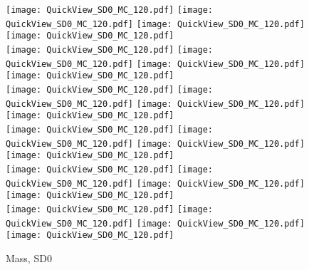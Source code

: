 \documentclass[amsmath,amssymb,aps,floatfix]{revtex4-1}
\begin{document}
\begin{figure}
   \centering
   \texttt{[image: QuickView\_SD0\_MC\_120.pdf]}
   \texttt{[image: QuickView\_SD0\_MC\_120.pdf]}
   \texttt{[image: QuickView\_SD0\_MC\_120.pdf]}
   \texttt{[image: QuickView\_SD0\_MC\_120.pdf]}\\
   \texttt{[image: QuickView\_SD0\_MC\_120.pdf]}
   \texttt{[image: QuickView\_SD0\_MC\_120.pdf]}
   \texttt{[image: QuickView\_SD0\_MC\_120.pdf]}
   \texttt{[image: QuickView\_SD0\_MC\_120.pdf]}\\
   \texttt{[image: QuickView\_SD0\_MC\_120.pdf]}
   \texttt{[image: QuickView\_SD0\_MC\_120.pdf]}
   \texttt{[image: QuickView\_SD0\_MC\_120.pdf]}
   \texttt{[image: QuickView\_SD0\_MC\_120.pdf]}\\
   \texttt{[image: QuickView\_SD0\_MC\_120.pdf]}
   \texttt{[image: QuickView\_SD0\_MC\_120.pdf]}
   \texttt{[image: QuickView\_SD0\_MC\_120.pdf]}
   \texttt{[image: QuickView\_SD0\_MC\_120.pdf]}\\
   \texttt{[image: QuickView\_SD0\_MC\_120.pdf]}
   \texttt{[image: QuickView\_SD0\_MC\_120.pdf]}
   \texttt{[image: QuickView\_SD0\_MC\_120.pdf]}
   \texttt{[image: QuickView\_SD0\_MC\_120.pdf]}\\
   \texttt{[image: QuickView\_SD0\_MC\_120.pdf]}
   \texttt{[image: QuickView\_SD0\_MC\_120.pdf]}
   \texttt{[image: QuickView\_SD0\_MC\_120.pdf]}
   \texttt{[image: QuickView\_SD0\_MC\_120.pdf]}\\
   \caption{Mass, SD0}
   \label{Figure:SD0Result}
\end{figure}
\end{document}
